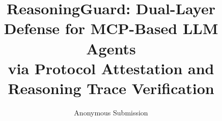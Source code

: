 \documentclass[letterpaper]{article}
\title{ReasoningGuard: Dual-Layer Defense for MCP-Based LLM Agents\\via Protocol Attestation and Reasoning Trace Verification}
\author{
    Anonymous Submission
}
\begin{document}
\maketitle

\begin{abstract}

\end{abstract}










\end{document}
